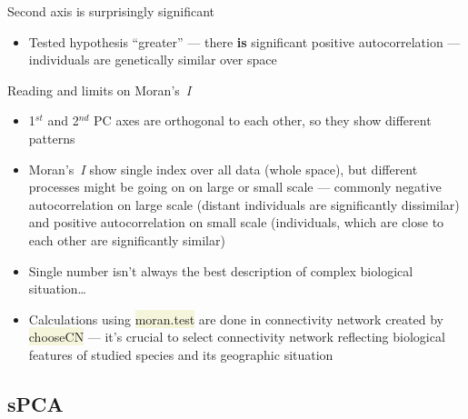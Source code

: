\documentclass[compress, xelatex, 11pt, xcolor=svgnames, aspectratio=169,
	hyperref={
		bookmarks=true,
		unicode=true,
		colorlinks=true,
		pdftitle={Molecular data in R},
		plainpages=false,
		pdfauthor={Vojtech Zeisek},
		pdfsubject={Course about phylogeny and evolution in R},
		pdfcreator={XeLaTeX},
		pdfkeywords={R, evolution, phylogeny, molecular data},
		linkcolor=Crimson, %
		anchorcolor=Magenta, %
		citecolor=Magenta, %
		filecolor=Magenta, %
		menucolor=Magenta, %
		urlcolor=DodgerBlue, %
		},
	url={hyphens, lowtilde} %
	]{beamer}
\renewcommand{\texttt}[1]{\colorbox{Beige}{{\ttfamily #1}}}
\begin{document}
\begin{frame}{Second axis is surprisingly significant}
	\begin{center}
		\texttt{[image: moran2.png]}
	\end{center}
	\begin{itemize}
		\item Tested hypothesis \enquote{greater} --- there \textbf{is} significant positive autocorrelation --- individuals are genetically similar over space
	\end{itemize}
\end{frame}

\begin{frame}{Reading and limits on Moran's~\textit{I}}
	\begin{itemize}
		\item 1$^{st}$ and 2$^{nd}$ PC axes are orthogonal to each other, so they show different patterns
		\item Moran's~\textit{I} show single index over all data (whole space), but different processes might be going on on large or small scale --- commonly negative autocorrelation on large scale (distant individuals are significantly dissimilar) and positive autocorrelation on small scale (individuals, which are close to each other are significantly similar)
		\item Single number isn't always the best description of complex biological situation\ldots
		\item Calculations using \texttt{moran.test} are done in connectivity network created by \texttt{chooseCN} --- it's crucial to select connectivity network reflecting biological features of studied species and its geographic situation
	\end{itemize}
\end{frame}

\subsection{sPCA}
\end{document}
